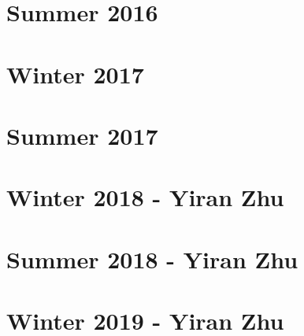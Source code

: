 \documentclass[12pt]{article}
\begin{document}
\section{Summer 2016}\label{sec:s16}

\newpage
\section{Winter 2017}\label{sec:w17}

\newpage
\section{Summer 2017}\label{sec:s17}

\newpage
\section{Winter 2018 - Yiran Zhu}\label{sec:w18}

\newpage
\section{Summer 2018 - Yiran Zhu}\label{sec:s18}

\newpage
\section{Winter 2019 - Yiran Zhu}\label{sec:w19}

\end{document}
